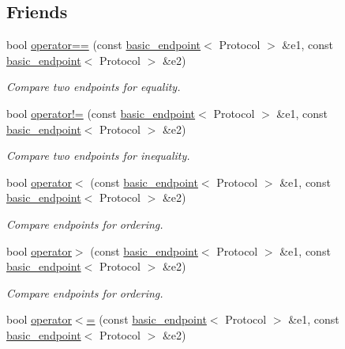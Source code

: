 \subsection*{Friends}
\begin{DoxyCompactItemize}
\item 
bool \hyperlink{classasio_1_1generic_1_1basic__endpoint_a9cf7a143935a3668c2278728be5a1f67}{operator==} (const \hyperlink{classasio_1_1generic_1_1basic__endpoint}{basic\+\_\+endpoint}$<$ Protocol $>$ \&e1, const \hyperlink{classasio_1_1generic_1_1basic__endpoint}{basic\+\_\+endpoint}$<$ Protocol $>$ \&e2)
\begin{DoxyCompactList}\small\item\em Compare two endpoints for equality. \end{DoxyCompactList}\item 
bool \hyperlink{classasio_1_1generic_1_1basic__endpoint_af35b46a86fa2bb95bb86758639669f61}{operator!=} (const \hyperlink{classasio_1_1generic_1_1basic__endpoint}{basic\+\_\+endpoint}$<$ Protocol $>$ \&e1, const \hyperlink{classasio_1_1generic_1_1basic__endpoint}{basic\+\_\+endpoint}$<$ Protocol $>$ \&e2)
\begin{DoxyCompactList}\small\item\em Compare two endpoints for inequality. \end{DoxyCompactList}\item 
bool \hyperlink{classasio_1_1generic_1_1basic__endpoint_aa8a1520cd511680ca56b6b854895e948}{operator$<$} (const \hyperlink{classasio_1_1generic_1_1basic__endpoint}{basic\+\_\+endpoint}$<$ Protocol $>$ \&e1, const \hyperlink{classasio_1_1generic_1_1basic__endpoint}{basic\+\_\+endpoint}$<$ Protocol $>$ \&e2)
\begin{DoxyCompactList}\small\item\em Compare endpoints for ordering. \end{DoxyCompactList}\item 
bool \hyperlink{classasio_1_1generic_1_1basic__endpoint_acab687ef803d3b3007e477f760665730}{operator$>$} (const \hyperlink{classasio_1_1generic_1_1basic__endpoint}{basic\+\_\+endpoint}$<$ Protocol $>$ \&e1, const \hyperlink{classasio_1_1generic_1_1basic__endpoint}{basic\+\_\+endpoint}$<$ Protocol $>$ \&e2)
\begin{DoxyCompactList}\small\item\em Compare endpoints for ordering. \end{DoxyCompactList}\item 
bool \hyperlink{classasio_1_1generic_1_1basic__endpoint_ad884b094ce89f7a0c4e525d4f0762513}{operator$<$=} (const \hyperlink{classasio_1_1generic_1_1basic__endpoint}{basic\+\_\+endpoint}$<$ Protocol $>$ \&e1, const \hyperlink{classasio_1_1generic_1_1basic__endpoint}{basic\+\_\+endpoint}$<$ Protocol $>$ \&e2)

\end{DoxyCompactItemize}

